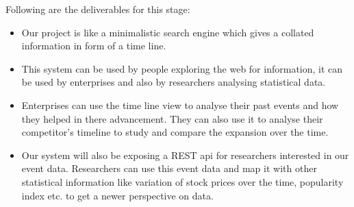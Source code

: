 \textnormal{
Following are the deliverables for this stage:
} 

\begin{itemize} 
\item{Our project is like a minimalistic search engine which gives a collated information in form of a time line.} 

\item{ This system can be used by people exploring the web for information, it can be used by enterprises and also by researchers analysing statistical data. }
	
\item{ Enterprises can use the time line view to analyse their past events and how they helped in there advancement. They can also use it to analyse their competitor's timeline to study and compare the expansion over the time.}

\item{ Our system will also be exposing a REST api for researchers interested in our event data. Researchers can use this event data and map it with other statistical information like variation of stock prices over the time, popularity index etc. to get a newer perspective on data.}

\end{itemize}

